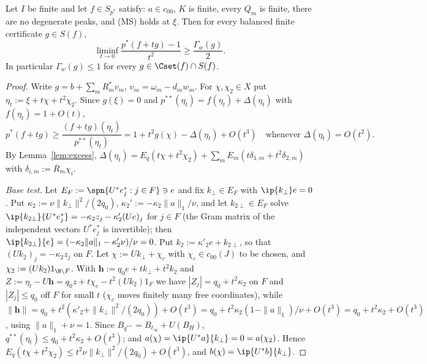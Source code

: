 \begin{proposition}\label{prop:lowerbound}
Let $I$ be finite and let $f\in S_{p^*}$ satisfy: $a\in c_{00}$, $K$ is
finite, every $Q_m$ is finite, there are no degenerate peaks, and
\textup{(MS)} holds at $\xi$.  Then for every balanced finite certificate
$g\in S(f)$,
\[
 \liminf_{t\to0}\frac{p^*(f+tg)-1}{t^2}\ge\frac{\Gamma_w(g)}2 .
\]
In particular $\Gamma_w(g)\le1$ for every $g\in\Cset(f)\cap S(f)$.
\end{proposition}

\begin{proof}
Write $g=b+\sum_mR_m^*v_m$, $v_m=\omega_m-d_mw_m$.  For $\chi,\chi_2\in X$
put $\eta_t:=\xi+t\chi+t^2\chi_2$.  Since $g(\xi)=0$ and
$p^{**}(\eta_t)=f(\eta_t)+\Delta(\eta_t)$ with $f(\eta_t)=1+O(t)$,
\begin{equation}\label{eq:testratio}
 p^*(f+tg)\ge\frac{(f+tg)(\eta_t)}{p^{**}(\eta_t)}
 =1+t^2g(\chi)-\Delta(\eta_t)+O(t^3)
 \quad\text{whenever }\Delta(\eta_t)=O(t^2).
\end{equation}
By Lemma~\ref{lem:excess},
$\Delta(\eta_t)=E_q(t\chi+t^2\chi_2)+\sum_mE_m(t\delta_{1,m}+t^2\delta_{2,m})$
with $\delta_{i,m}:=R_m\chi_i$.

\emph{Base test.}  Let $E_F:=\spn\{U^*e_j^*:j\in F\}\ni e$ and fix
$k_\perp\in E_F$ with $\ip{k_\perp}e=0$.  Put
$\kappa_2:=\nu\|k_\perp\|^2/(2q_0)$, $\kappa_2':=-\kappa_2\|a\|_1/\nu$, and
let $k_{2\perp}\in E_F$ solve $\ip{k_{2\perp}}{U^*e_j^*}=-\kappa_2z_j-
\kappa'_2(Ue)_j$ for $j\in F$ (the Gram matrix of the independent vectors
$U^*e_j^*$ is invertible); then $\ip{k_{2\perp}}{e}=(-\kappa_2\|a\|_1-
\kappa'_2\nu)/\nu=0$.  Put $k_2:=\kappa'_2e+k_{2\perp}$, so that
$(Uk_2)_j=-\kappa_2z_j$ on $F$.  Let $\chi:=Uk_\perp+\chi_c$ with
$\chi_c\in c_{00}(J)$ to be chosen, and $\chi_2:=(Uk_2)1_{\N\setminus F}$.
With $\mathbf h:=q_0e+tk_\perp+t^2k_2$ and $Z:=\eta_t-U\mathbf h=q_0z+t
\chi_c-t^2(Uk_2)1_F$ we have $|Z_j|=q_0+t^2\kappa_2$ on $F$ and $|Z_j|\le
q_0$ off $F$ for small $t$ ($\chi_c$ moves finitely many free
coordinates), while
$\|\mathbf h\|=q_0+t^2(\kappa'_2+\|k_\perp\|^2/(2q_0))+O(t^3)=q_0+t^2\kappa_2
(1-\|a\|_1)/\nu+O(t^3)=q_0+t^2\kappa_2+O(t^3)$, using $\|a\|_1+\nu=1$.
Since $B_{q^{**}}=B_{\ell_\infty}+U(B_H)$, $q^{**}(\eta_t)\le q_0+t^2\kappa_2
+O(t^3)$; and $a(\chi)=\ip{U^*a}{k_\perp}=0=a(\chi_2)$.  Hence
$E_q(t\chi+t^2\chi_2)\le t^2\nu\|k_\perp\|^2/(2q_0)+O(t^3)$, and
$b(\chi)=\ip{U^*b}{k_\perp}$.


\end{proof}
